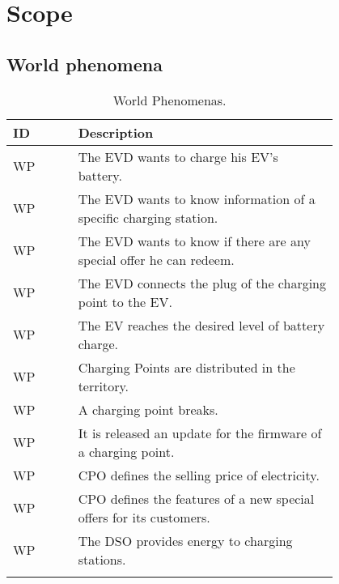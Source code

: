 \section{Scope}
\label{sec:scope}%

\subsection{World phenomena}
\label{subsec:world_phenomena}%
\setcounter{wp}{1}
\newcommand{\cwp}{\thewp\stepcounter{wp}}
\begin{center}
    \begin{longtable}{ |l|p{0.8\linewidth}| }
        \hline
        \textbf{ID} & \textbf{Description}                                                \\
        \hline
        WP\cwp      & The EVD wants to charge his EV's battery.                           \\
        \hline
        WP\cwp      & The EVD wants to know information of a specific charging station.   \\
        \hline
        WP\cwp      & The EVD wants to know if there are any special offer he can redeem. \\
        \hline
        WP\cwp      & The EVD connects the plug of the charging point to the EV.          \\
        \hline
        WP\cwp      & The EV reaches the desired level of battery charge.                 \\
        \hline
        WP\cwp      & Charging Points are distributed in the territory.                   \\
        \hline
        WP\cwp      & A charging point breaks.                                            \\
        \hline
        WP\cwp      & It is released an update for the firmware of a charging point.      \\
        \hline
        WP\cwp      & CPO defines the selling price of electricity.                       \\
        \hline
        WP\cwp      & CPO defines the features of a new special offers for its customers. \\
        \hline
        WP\cwp      & The DSO provides energy to charging stations.                       \\
        \hline
        \caption{World Phenomenas.}
        \label{tab:worldph_tab}%
    \end{longtable}
\end{center}

